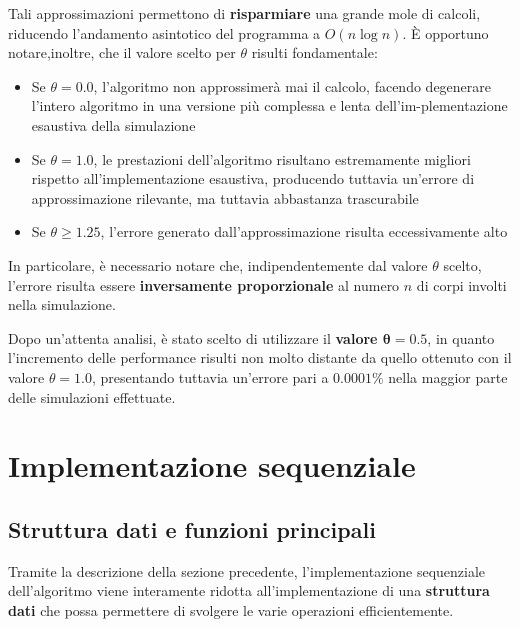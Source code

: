 \documentclass[12pt]{report}
\begin{document}
    Tali approssimazioni permettono di \textbf{risparmiare} una grande mole di calcoli, riducendo l'andamento asintotico del programma a $O(n \log n)$. È opportuno notare,inoltre, che il valore scelto per $\theta$ risulti fondamentale:
    \begin{itemize}
        \item Se $\theta = 0.0$, l'algoritmo non approssimerà mai il calcolo, facendo degenerare l'intero algoritmo in una versione più complessa e lenta dell'im-plementazione esaustiva della simulazione
        \item Se $\theta = 1.0$, le prestazioni dell'algoritmo risultano estremamente migliori rispetto all'implementazione esaustiva, producendo tuttavia un'errore di approssimazione rilevante, ma tuttavia abbastanza trascurabile
        \item Se $\theta \geq 1.25$, l'errore generato dall'approssimazione risulta eccessivamente alto
    \end{itemize}

    In particolare, è necessario notare che, indipendentemente dal valore $\theta$ scelto, l'errore risulta essere \textbf{inversamente proporzionale} al numero $n$ di corpi involti nella simulazione.

    Dopo un'attenta analisi, è stato scelto di utilizzare il \textbf{valore $\mathbf{\theta = 0.5}$}, in quanto l'incremento delle performance risulti non molto distante da quello ottenuto con il valore $\theta = 1.0$, presentando tuttavia un'errore pari a $0.0001\%$ nella maggior parte delle simulazioni effettuate.
    
    \quad

    \section{Implementazione sequenziale}

    \subsection{Struttura dati e funzioni principali}

    Tramite la descrizione della sezione precedente, l'implementazione sequenziale dell'algoritmo viene interamente ridotta all'implementazione di una \textbf{struttura dati} che possa permettere di svolgere le varie operazioni efficientemente.
    
\end{document}
